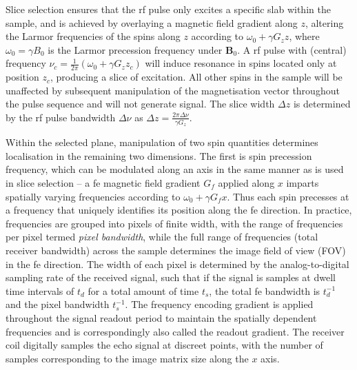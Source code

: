 Slice selection ensures that the \gls{rf} pulse only excites a specific slab within the sample, and is achieved by overlaying a magnetic field gradient along $z$, altering the Larmor frequencies of the spins along $z$ according to $\omega_0 + \gamma G_zz$, where $\omega_0 = \gamma B_0$ is the Larmor precession frequency under $\mathbf{B}_0$.
A \gls{rf} pulse with (central) frequency $\nu_c = \frac{1}{2\pi} (\omega_0 + \gamma G_z z_c)$ will induce resonance in spins located only at position $z_c$, producing a slice of excitation. %
All other spins in the sample will be unaffected by subsequent manipulation of the magnetisation vector throughout the pulse sequence and will not generate signal.
The slice width $\Delta z$ is determined by the \gls{rf} pulse bandwidth $\Delta\nu$ as $\Delta z = \frac{2 \pi \Delta \nu}{\gamma G_z}$.

Within the selected plane, manipulation of two spin quantities determines localisation in the remaining two dimensions.
The first is spin precession frequency, which can be modulated along an axis in the same manner as is used in slice selection -- a \gls{fe} magnetic field gradient $G_{f}$ applied along $x$ imparts spatially varying frequencies according to $\omega_0 + \gamma G_{f}x$.
Thus each spin precesses at a frequency that uniquely identifies its position along the \gls{fe} direction.
In practice, frequencies are grouped into pixels of finite width, with the range of frequencies per pixel termed \textit{pixel bandwidth}, while the full range of frequencies (total receiver bandwidth) across the sample determines the image field of view (FOV) in the \gls{fe} direction.
The width of each pixel is determined by the analog-to-digital sampling rate of the received signal, such that if the signal is samples at dwell time intervals of $t_d$ for a total amount of time $t_s$, the total \gls{fe} bandwidth is $t_d^{-1}$ and the pixel bandwidth $t_s^{-1}$.
The frequency encoding gradient is applied throughout the signal readout period to maintain the spatially dependent frequencies and is correspondingly also called the readout gradient.
The receiver coil digitally samples the echo signal at discreet points, with the number of samples corresponding to the image matrix size along the $x$ axis.

